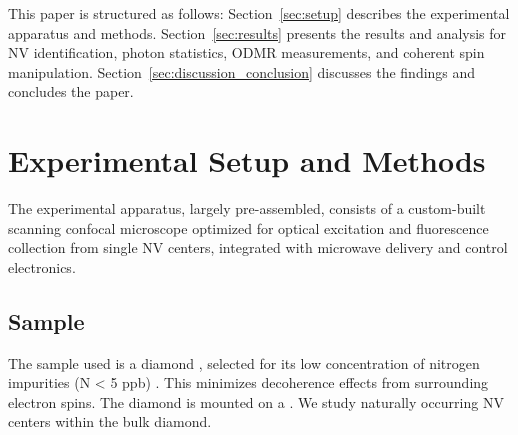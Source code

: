 \documentclass[aps,prb,twocolumn,superscriptaddress,floatfix,longbibliography,citeautoscript]{revtex4-2}
\begin{document}
This paper is structured as follows: Section~\ref{sec:setup} describes the experimental apparatus and methods. Section~\ref{sec:results} presents the results and analysis for NV identification, photon statistics, ODMR measurements, and coherent spin manipulation. Section~\ref{sec:discussion_conclusion} discusses the findings and concludes the paper.

\section{\label{sec:setup}Experimental Setup and Methods}

The experimental apparatus, largely pre-assembled, consists of a custom-built scanning confocal microscope optimized for optical excitation and fluorescence collection from single NV centers, integrated with microwave delivery and control electronics. 

\subsection{\label{sec:sample}Sample}
The sample used is a  diamond 
, selected for its low concentration of nitrogen impurities (N < 5 ppb) . This minimizes decoherence effects from surrounding electron spins. The diamond is mounted on a . We study naturally occurring NV centers within the bulk diamond. 
\end{document}
